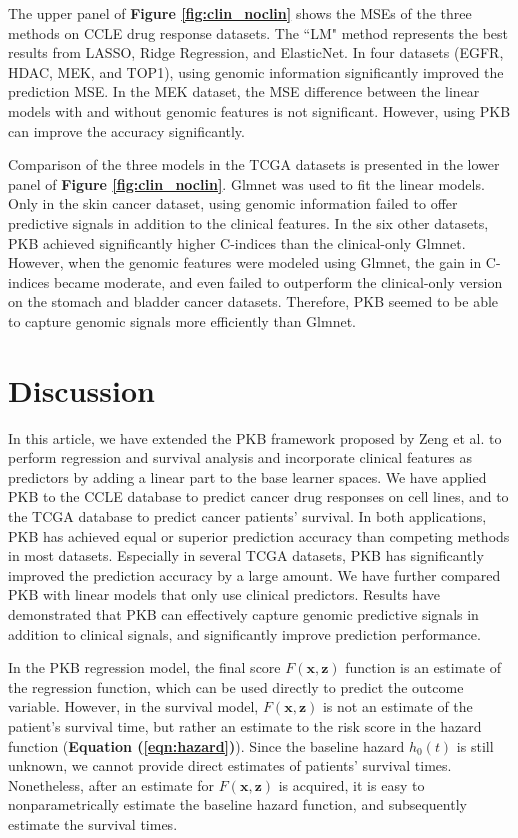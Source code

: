 \documentclass[a4paper,12pt]{article}
\newcommand{\bd}[1]{\mathbf{#1}}
\begin{document}
The upper panel of \textbf{Figure \ref{fig:clin_noclin}} shows the MSEs of the three methods on CCLE drug response datasets. The ``LM" method represents the best results from LASSO, Ridge Regression, and ElasticNet. In four datasets (EGFR, HDAC, MEK, and TOP1), using genomic information significantly improved the prediction MSE. In the MEK dataset, the MSE difference between the linear models with and without genomic features is not significant. However, using PKB can improve the accuracy significantly.

Comparison of the three models in the TCGA datasets is presented in the lower panel of \textbf{Figure \ref{fig:clin_noclin}}. Glmnet was used to fit the linear models. Only in the skin cancer dataset, using genomic information failed to offer predictive signals in addition to the clinical features. In the six other datasets, PKB achieved significantly higher C-indices than the clinical-only Glmnet. However, when the genomic features were modeled using Glmnet, the gain in C-indices became moderate, and even failed to outperform the clinical-only version on the stomach and bladder cancer datasets. Therefore, PKB seemed to be able to capture genomic signals more efficiently than Glmnet.

\section{Discussion}
In this article, we have extended the PKB framework proposed by  Zeng et al.\cite{zeng2019pathway} to perform regression and survival analysis and incorporate clinical features as predictors by adding a linear part to the base learner spaces. We have applied PKB to the CCLE database to predict cancer drug responses on cell lines, and to the TCGA database to predict cancer patients' survival. In both applications, PKB has achieved equal or superior prediction accuracy than competing methods in most datasets. Especially in several TCGA datasets, PKB has significantly improved the prediction accuracy by a large amount. We have further compared PKB with linear models that only use clinical predictors. Results have demonstrated that PKB can effectively capture genomic predictive signals in addition to clinical signals, and significantly improve prediction performance.

In the PKB regression model, the final score $F(\bd{x}, \bd{z})$ function is an estimate of the regression function, which can be used directly to predict the outcome variable. However, in the survival model, $F(\bd{x}, \bd{z})$ is not an estimate of the patient's survival time, but rather an estimate to the risk score in the hazard function (\textbf{Equation (\ref{eqn:hazard})}). Since the baseline hazard $h_0(t)$ is still unknown, we cannot provide direct estimates of patients' survival times. Nonetheless, after an estimate for $F(\bd{x}, \bd{z})$ is acquired, it is easy to nonparametrically estimate the baseline hazard function, and subsequently estimate the survival times.
\end{document}
